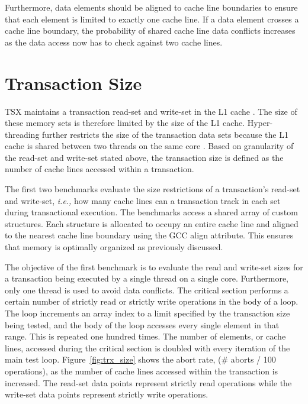 \documentclass{sig-alternate}
\begin{document}
Furthermore, data elements should be aligned to cache line boundaries to ensure that each
element is limited to exactly one cache line.  If a data element crosses a cache line
boundary, the probability of shared cache line data conflicts increases as the data access
now has to check against two cache lines.

\section{Transaction Size}

TSX maintains a transaction read-set and write-set in the L1 cache \cite{intel_opt_man}.
The size of these memory sets is therefore limited by the size of the L1 cache.
Hyper-threading further restricts the size of the transaction data sets because the L1
cache is shared between two threads on the same core \cite{intel_opt_man}.  Based on
granularity of the read-set and write-set stated above, the transaction size is defined as
the number of cache lines accessed within a transaction.

The first two benchmarks evaluate the size restrictions of a transaction's read-set and
write-set, \emph{i.e.,} how many cache lines can a transaction track in each set during
transactional execution.  The benchmarks access a shared array of custom structures.  Each
structure is allocated to occupy an entire cache line and aligned to the nearest cache
line boundary using the GCC align attribute.  This ensures that memory is optimally
organized as previously discussed.

The objective of the first benchmark is to evaluate the read and write-set sizes for a
transaction being executed by a single thread on a single core.  Furthermore, only one
thread is used to avoid data conflicts.  The critical section performs a certain number of
strictly read or strictly write operations in the body of a loop.  The loop increments an
array index to a limit specified by the transaction size being tested, and the body of the
loop accesses every single element in that range.  This is repeated one hundred times.
The number of elements, or cache lines, accessed during the critical section is doubled
with every iteration of the main test loop.  Figure~\ref{fig:trx_size} shows the abort
rate, (\# aborts / 100 operations), as the number of cache lines accessed within the
transaction is increased.  The read-set data points represent strictly read operations
while the write-set data points represent strictly write operations.
\end{document}
